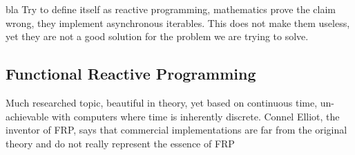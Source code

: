 bla\cite{meijer2014reactive}
Try to define itself as reactive programming, mathematics prove the claim wrong, they implement asynchronous iterables. This does not make them useless, yet they are not a good solution for the problem we are trying to solve.


\subsection{Functional Reactive Programming}
\label{frp}
Much researched topic, beautiful in theory, yet based on continuous time, un-achievable with computers where time is inherently discrete. Connel Elliot, the inventor of FRP, says that commercial implementations are far from the original theory and do not really represent the essence of FRP
